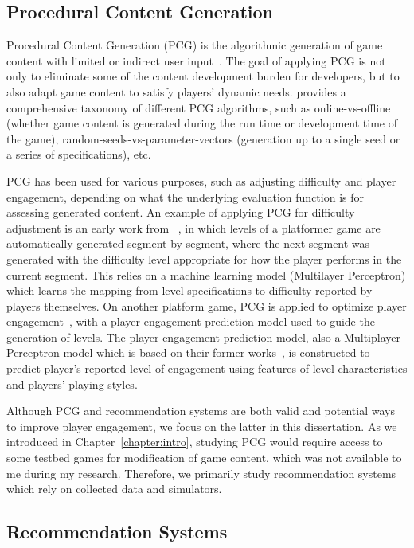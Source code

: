 \subsection{Procedural Content Generation}\label{sec:pcg}

Procedural Content Generation (PCG) is the algorithmic generation of game content with limited or indirect user input~\citep{yannakakis2011experience,togelius2011search}. The goal of applying PCG is not only to eliminate some of the content development burden for developers, but to also adapt game content to satisfy players' dynamic needs. \textcite{togelius2011search} provides a comprehensive taxonomy of different PCG algorithms, such as online-vs-offline (whether game content is generated during the run time or development time of the game), random-seeds-vs-parameter-vectors (generation up to a single seed or a series of specifications), etc.

PCG has been used for various purposes, such as adjusting difficulty and player engagement, depending on what the underlying evaluation function is for assessing generated content. An example of applying PCG for difficulty adjustment is an early work from ~\textcite{jennings2010polymorph}, in which levels of a platformer game are automatically generated segment by segment, where the next segment was generated with the difficulty level appropriate for how the player performs in the current segment. This relies on a machine learning model (Multilayer Perceptron) which learns the mapping from level specifications to difficulty reported by players themselves. On another platform game, PCG is applied to optimize player engagement~\citep{shaker2012evolving}, with a player engagement prediction model used to guide the generation of levels. The player engagement prediction model, also a Multiplayer Perceptron model which is based on their former works~\citep{shaker2011feature}, is constructed to predict player's reported level of engagement using features of level characteristics and players' playing styles.

Although PCG and recommendation systems are both valid and potential ways to improve player engagement, we focus on the latter in this dissertation. As we introduced in Chapter~\ref{chapter:intro}, studying PCG would require access to some testbed games for modification of game content, which was not available to me during my research. Therefore, we primarily study recommendation systems which rely on collected data and simulators.

\subsection{Recommendation Systems}\label{sec:recsys}

